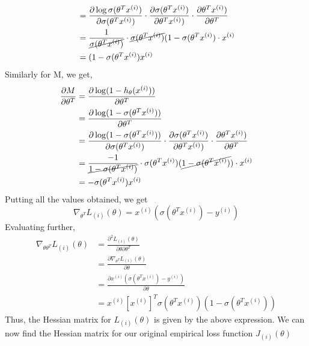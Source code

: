 \documentclass[12pt]{article}
\begin{document}
\begin{flushleft}
\begin{equation}
\begin{aligned}
    &=\frac{\partial \log \sigma(\theta^T x^{(i)})}{\partial \sigma(\theta^T x^{(i)})}\cdot\frac{\partial \sigma(\theta^T x^{(i)})}{\partial \theta^T x^{(i)})}\cdot\frac{\partial \theta^T x^{(i)})}{\partial \theta^T}\\
    &=\frac{1}{\cancel{\sigma(\theta^T x^{(i)})}}\cdot\cancel{\sigma(\theta^T x^{(i)})}(1-\sigma(\theta^T x^{(i)})\cdot x^{(i)}\\
    &=(1-\sigma(\theta^T x^{(i)})x^{(i)}
\end{aligned}
\end{equation}
Similarly for M, we get,
\begin{equation}
\begin{aligned}
\frac{\partial M}{\partial \theta^T}
    &=\frac{\partial \log(1- h_\theta(x^{(i)}))}{\partial \theta^T}\\
    &=\frac{\partial \log(1- \sigma(\theta^T x^{(i)}))}{\partial \theta^T}\\
    &=\frac{\partial \log (1-\sigma(\theta^T x^{(i)}))}{\partial \sigma(\theta^T x^{(i)})}\cdot\frac{\partial \sigma(\theta^T x^{(i)})}{\partial \theta^T x^{(i)})}\cdot\frac{\partial \theta^T x^{(i)})}{\partial \theta^T}\\
    &=\frac{-1}{\cancel{1-\sigma(\theta^T x^{(i)})}}\cdot\sigma(\theta^T x^{(i)})(\cancel{1-\sigma(\theta^T x^{(i)})})\cdot x^{(i)}\\
    &=-\sigma(\theta^T x^{(i)}) x^{(i)}
\end{aligned}
\end{equation}
Putting all the values obtained, we get
\begin{equation}
    \nabla_{\theta^T} L_{(i)}(\theta)=x^{(i)}(\sigma(\theta^T x^{(i)})-y^{(i)})
\end{equation}
Evaluating further, 
\begin{equation}
\begin{aligned}
\nabla_{\theta\theta^T}L_{(i)}(\theta)&=\frac{{\partial^2} L_{(i)}(\theta)}{\partial \theta \partial \theta^T}\\
    &=\frac{\partial \nabla_{\theta^T} L_{(i)}(\theta)}{\partial \theta}\\
    &=\frac{\partial x^{(i)}(\sigma(\theta^T x^{(i)})-y^{(i)})}{\partial \theta}\\
    &=x^{(i)}[x^{(i)}]^T\sigma(\theta^T x^{(i)})(1-\sigma(\theta^T x^{(i)}))
\end{aligned}
\end{equation}
Thus, the Hessian matrix for $L_{(i)}(\theta)$ is given by the above expression. We can now find the Hessian matrix for our original empirical loss function $J_{(i)}(\theta)$

\end{flushleft}
\end{document}
